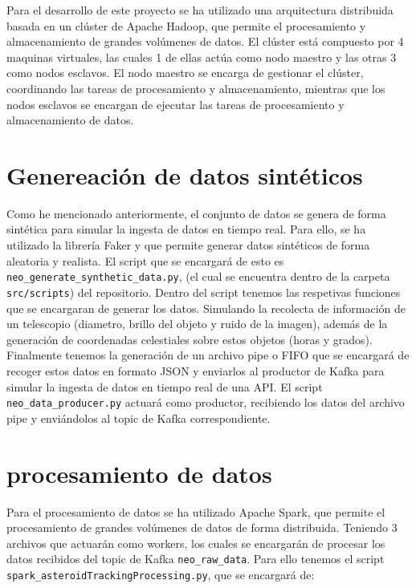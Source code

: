 \documentclass[12pt]{article}
\begin{document}
Para el desarrollo de este proyecto se ha utilizado una arquitectura distribuida basada en un clúster de Apache Hadoop,
que permite el procesamiento y almacenamiento de grandes volúmenes de datos. El clúster está compuesto por 4 maquinas virtuales,
las cuales 1 de ellas actúa como nodo maestro y las otras 3 como nodos esclavos.
El nodo maestro se encarga de gestionar el clúster, coordinando las tareas de procesamiento y almacenamiento,
mientras que los nodos esclavos se encargan de ejecutar las tareas de procesamiento y almacenamiento de datos.

\section{Genereación de datos sintéticos}

Como he mencionado anteriormente, el conjunto de datos se genera de forma sintética para simular la ingesta de datos en tiempo real.
Para ello, se ha utilizado la librería Faker \cite[Faker]{joke2k-faker} y \cite[numpy]{numpy} que permite generar datos sintéticos 
de forma aleatoria y realista. El script que se encargará de esto es \texttt{neo\_generate\_synthetic\_data.py}, (el cual se
encuentra dentro de la carpeta \texttt{src/scripts}) del repositorio. Dentro del script tenemos las respetivas funciones
que se encargaran de generar los datos. Simulando la recolecta de información de un telescopio (diametro, brillo del objeto y 
ruido de la imagen), además de la generación de coordenadas celestiales sobre estos objetos (horas y grados).
\\
Finalmente tenemos la generación de un archivo pipe o FIFO que se encargará de recoger estos datos en formato JSON y enviarlos 
al productor de Kafka para simular la ingesta de datos en tiempo real de una API. El script \texttt{neo\_data\_producer.py} 
actuará como productor, recibiendo los datos del archivo pipe y enviándolos al topic de Kafka correspondiente.

\section{procesamiento de datos}

Para el procesamiento de datos se ha utilizado Apache Spark, que permite el procesamiento de grandes volúmenes de datos de 
forma distribuida. Teniendo 3 archivos que actuarán como workers, los cuales se encargarán de procesar los datos
recibidos del topic de Kafka \texttt{neo\_raw\_data}. Para ello tenemos el script \texttt{spark\_asteroidTrackingProcessing.py}, que se
encargará de:
\end{document}
